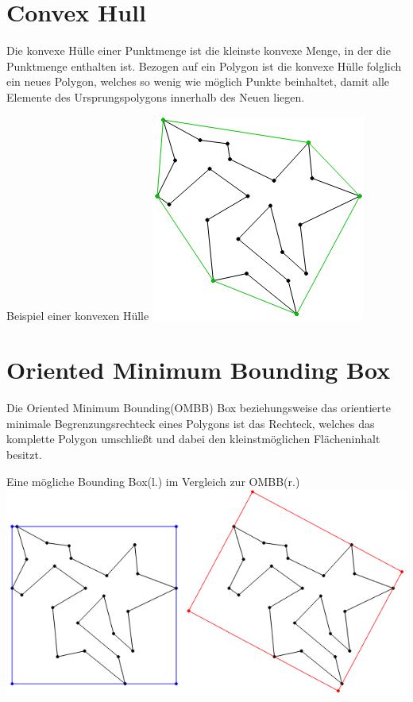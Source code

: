 \section{Convex Hull}
Die konvexe Hülle einer Punktmenge ist die kleinste konvexe Menge, in der die Punktmenge enthalten ist.
Bezogen auf ein Polygon ist die konvexe Hülle folglich ein neues Polygon, welches so wenig wie möglich Punkte beinhaltet, damit alle Elemente des Ursprungspolygons innerhalb des Neuen liegen.
\begin{Bild}{Beispiel einer konvexen Hülle}
	\includegraphics[]{Bilder/convex_hull}
\end{Bild}

\section{Oriented Minimum Bounding Box}
Die Oriented Minimum Bounding(OMBB) Box beziehungsweise das orientierte minimale Begrenzungsrechteck eines Polygons ist das Rechteck, welches das komplette Polygon umschließt und dabei den kleinstmöglichen Flächeninhalt besitzt.
\begin{Bild}{Eine mögliche Bounding Box(l.) im Vergleich zur OMBB(r.)}
	\includegraphics[width = \textwidth]{Bilder/aabb_vs_ombb}
\end{Bild}

